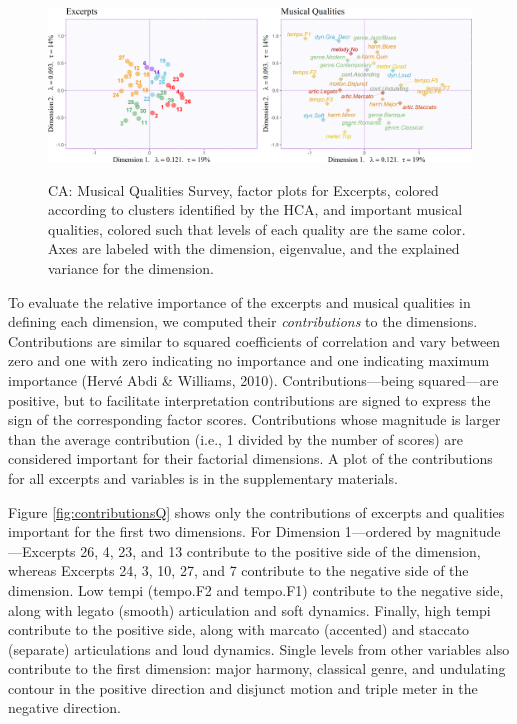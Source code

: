 \documentclass[
  english,
  man]{apa6}
\begin{document}
\begin{figure}   
  \centering  
  \caption{CA: Musical Qualities Survey, factor plots for Excerpts, colored according to clusters identified by the HCA, and important musical qualities, colored such that levels of each quality are the same color. Axes are labeled with the dimension, eigenvalue, and the explained variance for the dimension.}
    \includegraphics{./Music-Descriptor-Space_files/figure-latex/factormapsQcode-1.png}
  \label{fig:factormapsQ}
\end{figure}

To evaluate the relative importance of the excerpts and musical qualities in defining each dimension, we computed their \emph{contributions} to the dimensions. Contributions are similar to squared coefficients of correlation and vary between zero and one with zero indicating no importance and one indicating maximum importance (Hervé Abdi \& Williams, 2010). Contributions---being squared---are positive, but to facilitate interpretation contributions are signed to express the sign of the corresponding factor scores. Contributions whose magnitude is larger than the average contribution (i.e., 1 divided by the number of scores) are considered important for their factorial dimensions. A plot of the contributions for all excerpts and variables is in the supplementary materials.

Figure \ref{fig:contributionsQ} shows only the contributions of excerpts and qualities important for the first two dimensions. For Dimension 1---ordered by magnitude---Excerpts 26, 4, 23, and 13 contribute to the positive side of the dimension, whereas Excerpts 24, 3, 10, 27, and 7 contribute to the negative side of the dimension. Low tempi (tempo.F2 and tempo.F1) contribute to the negative side, along with legato (smooth) articulation and soft dynamics. Finally, high tempi contribute to the positive side, along with marcato (accented) and staccato (separate) articulations and loud dynamics. Single levels from other variables also contribute to the first dimension: major harmony, classical genre, and undulating contour in the positive direction and disjunct motion and triple meter in the negative direction.
\end{document}
